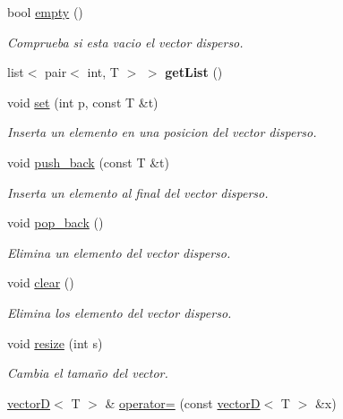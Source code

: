\begin{DoxyCompactItemize}
bool \hyperlink{classvectorD_a461a5d4cd0f19315027629b8d1e13c03}{empty} ()
\begin{DoxyCompactList}\small\item\em Comprueba si esta vacio el vector disperso. \end{DoxyCompactList}\item 
\mbox{\label{classvectorD_abc7a7ef83bc2e4a97f51a3f219034bbe}} 
list$<$ pair$<$ int, T $>$ $>$ {\bfseries get\+List} ()
\item 
void \hyperlink{classvectorD_a2afa5743fc4549bfb12d90a4f34a1646}{set} (int p, const T \&t)
\begin{DoxyCompactList}\small\item\em Inserta un elemento en una posicion del vector disperso. \end{DoxyCompactList}\item 
void \hyperlink{classvectorD_a490aa6ae67bccd2cb7345e8204c703ab}{push\+\_\+back} (const T \&t)
\begin{DoxyCompactList}\small\item\em Inserta un elemento al final del vector disperso. \end{DoxyCompactList}\item 
void \hyperlink{classvectorD_ace854aa58e0dd93e49129ae5045c3401}{pop\+\_\+back} ()
\begin{DoxyCompactList}\small\item\em Elimina un elemento del vector disperso. \end{DoxyCompactList}\item 
\mbox{\label{classvectorD_ac31cacb13b79495afb38f5147c534a05}} 
void \hyperlink{classvectorD_ac31cacb13b79495afb38f5147c534a05}{clear} ()
\begin{DoxyCompactList}\small\item\em Elimina los elemento del vector disperso. \end{DoxyCompactList}\item 
void \hyperlink{classvectorD_a7e8af2f1c1a56e4e0496011a662417cf}{resize} (int s)
\begin{DoxyCompactList}\small\item\em Cambia el tamaño del vector. \end{DoxyCompactList}\item 
\hyperlink{classvectorD}{vectorD}$<$ T $>$ \& \hyperlink{classvectorD_a16d2e67eccae9d0a4fe5aac2628fe0ca}{operator=} (const \hyperlink{classvectorD}{vectorD}$<$ T $>$ \&x)

\end{DoxyCompactItemize}
